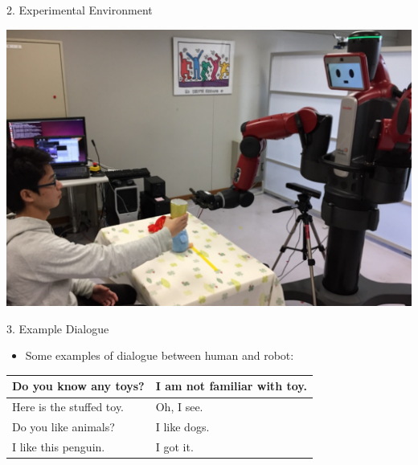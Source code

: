 \documentclass[final,hyperref={pdfpagelabels=false}]{beamer}
\begin{document}
\begin{frame}[t]
\begin{columns}[t]
\begin{column}{.3\textwidth}
    \begin{block}{2. Experimental Environment}
      \begin{center}
        \includegraphics[width=0.9\columnwidth]{./fig/experimental_env.pdf}
      \end{center}
    \end{block}

    \begin{block}{3. Example Dialogue}
      \begin{itemize}
        \item Some examples of dialogue between human and robot:
      \end{itemize}

    \begin{table}
        \label{tab:dialogue}
        \begin{tabular}{|l||l|}
        \hline
           Do you know any toys? & I am not familiar with toy.  \\
        \hline
           Here is the stuffed toy. & Oh, I see.  \\
        \hline
           Do you like animals? & I like dogs.  \\
        \hline
           I like this penguin. & I got it. \\
        \hline
        \end{tabular}
    \end{table}

    \end{block}
  \end{column} %



\end{columns}
\end{frame}
\end{document}
